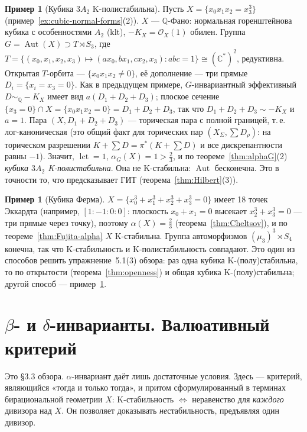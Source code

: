 \documentclass[11pt,a4paper]{article}
\theoremstyle{plain}
\theoremstyle{definition}
\newtheorem{example}[theorem]{Пример}
\theoremstyle{remark}
\renewcommand{\C}{\mathbb{C}}
\newcommand{\Q}{\mathbb{Q}}
\newcommand{\cO}{\mathcal{O}}
\DeclareMathOperator{\Aut}{Aut}
\DeclareMathOperator{\lct}{lct}
\begin{document}
\begin{example}[Кубика $3A_2$ K-полистабильна]\label{ex:3A2-polystable}
Пусть $X=\{x_0x_1x_2=x_3^3\}$ (пример~\ref{ex:cubic-normal-forms}(2)). $X$ --- $\Q$-Фано: нормальная
горенштейнова кубика с особенностями $A_2$ (klt), $-K_X=\cO_X(1)$ обилен. Группа
$G=\Aut(X)\supset T\rtimes S_3$, где $T=\{(x_0,x_1,x_2,x_3)\mapsto(ax_0,bx_1,cx_2,x_3):abc=1\}\cong(\C^*)^2$,
редуктивна. Открытая $T$-орбита --- $\{x_0x_1x_2\ne0\}$, её дополнение --- три прямые
$D_i=\{x_i=x_3=0\}$. Как в предыдущем примере, $G$-инвариантный эффективный $D\sim_\Q-K_X$ имеет вид
$a(D_1+D_2+D_3)$; плоское сечение $\{x_3=0\}\cap X=\{x_0x_1x_2=0\}=D_1+D_2+D_3$, так что
$D_1+D_2+D_3\sim-K_X$ и $a=1$. Пара $(X,D_1+D_2+D_3)$ --- торическая пара с полной границей,
т.\,е. лог-каноническая (это общий факт для торических пар $(X_\Sigma,\sum D_\rho)$: на торическом
разрешении $K+\sum D=\pi^*(K+\sum D)$ и все дискрепантности равны $-1$). Значит, $\lct=1$,
$\alpha_G(X)=1>\frac23$, и по теореме~\ref{thm:alphaG}(2) \emph{кубика $3A_2$ K-полистабильна}.
Она не K-стабильна: $\Aut$ бесконечна. Это в точности то, что предсказывает ГИТ
(теорема~\ref{thm:Hilbert}(3)).
\end{example}

\begin{example}[Кубика Ферма]
$X=\{x_0^3+x_1^3+x_2^3+x_3^3=0\}$ имеет 18 точек Эккардта (например, $[1:-1:0:0]$: плоскость
$x_0+x_1=0$ высекает $x_2^3+x_3^3=0$ --- три прямые через точку), поэтому $\alpha(X)=\frac23$
(теорема~\ref{thm:Cheltsov}), и по теореме~\ref{thm:Fujita-alpha} $X$ K-стабильна. Группа
автоморфизмов $(\mu_3)^3\rtimes S_4$ конечна, так что K-стабильность и K-полистабильность
совпадают. Это один из способов решить упражнение~5.1(3) обзора: раз одна кубика K-(полу)стабильна,
то по открытости (теорема~\ref{thm:openness}) и общая кубика K-(полу)стабильна; другой способ ---
пример~\ref{ex:3A2-polystable}.
\end{example}

\section{$\beta$- и $\delta$-инварианты. Валюативный критерий}\label{sec:beta}

Это \S3.3 обзора. $\alpha$-инвариант даёт лишь достаточные условия. Здесь --- критерий,
являющийся «тогда и только тогда», и притом сформулированный в терминах бирациональной геометрии
$X$: K-стабильность $\iff$ неравенство для \emph{каждого} дивизора над $X$. Он позволяет доказывать
\emph{не}стабильность, предъявляя один дивизор.
\end{document}
